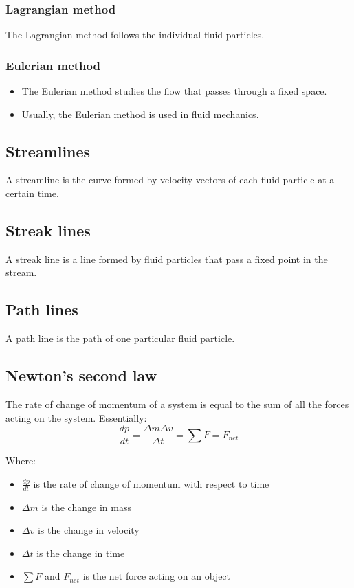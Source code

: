 \documentclass[11pt]{article}
\begin{document}
\subsubsection{Lagrangian method}
\label{sec:orgc82ec8a}
The Lagrangian method follows the individual fluid particles.

\subsubsection{Eulerian method}
\label{sec:org0d6f377}
\begin{itemize}
\item The Eulerian method studies the flow that passes through a fixed space.
\item Usually, the Eulerian method is used in fluid mechanics.
\end{itemize}

\subsection{Streamlines}
\label{sec:orgd9f2bd8}
A streamline is the curve formed by velocity vectors of each fluid particle at a certain time.

\subsection{Streak lines}
\label{sec:org9df21b8}
A streak line is a line formed by fluid particles that pass a fixed point in the stream.

\subsection{Path lines}
\label{sec:org58a84c1}
A path line is the path of one particular fluid particle.

\subsection{Newton's second law}
\label{sec:orgd8ea02b}
The rate of change of momentum of a system is equal to the sum of all the forces acting on the system. Essentially:
\[\frac{dp}{dt} = \frac{\Delta m \Delta v}{\Delta t} = \sum F = F_{net}\]

Where:
\begin{itemize}
\item \(\frac{dp}{dt}\) is the rate of change of momentum with respect to time
\item \(\Delta m\) is the change in mass
\item \(\Delta v\) is the change in velocity
\item \(\Delta t\) is the change in time
\item \(\sum F\) and \(F_{net}\) is the net force acting on an object
\end{itemize}
\end{document}
